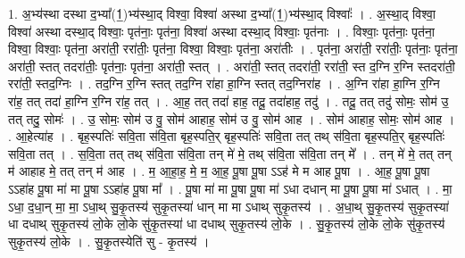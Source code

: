 \documentclass[17pt]{extarticle}
\begin{document}
1. अ॒भ्य॑स्था दस्था द॒भ्या᳚(1॒)भ्य॑स्था॒द् विश्वा॒ विश्वा॑ अस्था द॒भ्या᳚(1॒)भ्य॑स्था॒द् विश्वाः᳚ । . अ॒स्था॒द् विश्वा॒ विश्वा॑ अस्था दस्था॒द् विश्वाः॒ पृत॑नाः॒ पृत॑ना॒ विश्वा॑ अस्था दस्था॒द् विश्वाः॒ पृत॑नाः । . विश्वाः॒ पृत॑नाः॒ पृत॑ना॒ विश्वा॒ विश्वाः॒ पृत॑ना॒ अरा॑ती॒ ररा॑तीः॒ पृत॑ना॒ विश्वा॒ विश्वाः॒ पृत॑ना॒ अरा॑तीः । . पृत॑ना॒ अरा॑ती॒ ररा॑तीः॒ पृत॑नाः॒ पृत॑ना॒ अरा॑ती॒ स्तत् तदरा॑तीः॒ पृत॑नाः॒ पृत॑ना॒ अरा॑ती॒ स्तत् । . अरा॑ती॒ स्तत् तदरा॑ती॒ ररा॑ती॒ स्त द॒ग्नि र॒ग्नि स्तदरा॑ती॒ ररा॑ती॒ स्तद॒ग्निः । . तद॒ग्नि र॒ग्नि स्तत् तद॒ग्नि रा॑हा हा॒ग्नि स्तत् तद॒ग्निरा॑ह । . अ॒ग्नि रा॑हा हा॒ग्नि र॒ग्नि रा॑ह॒ तत् तदा॑ हा॒ग्नि र॒ग्नि रा॑ह॒ तत् । . आ॒ह॒ तत् तदा॑ हाह॒ तदू॒ तदा॑हाह॒ तदु॑ । . तदू॒ तत् तदु॑ सोमः॒ सोम॑ उ॒ तत् तदु॒ सोमः॑ । . उ॒ सोमः॒ सोम॑ उ वु॒ सोम॑ आहाह॒ सोम॑ उ वु॒ सोम॑ आह । . सोम॑ आहाह॒ सोमः॒ सोम॑ आह । . आ॒हेत्या॑ह । . बृह॒स्पतिः॑ सवि॒ता स॑वि॒ता बृह॒स्पति॒र् बृह॒स्पतिः॑ सवि॒ता तत् तथ् स॑वि॒ता बृह॒स्पति॒र् बृह॒स्पतिः॑ सवि॒ता तत् । . स॒वि॒ता तत् तथ् स॑वि॒ता स॑वि॒ता तन् मे॑ मे॒ तथ् स॑वि॒ता स॑वि॒ता तन् मे᳚ । . तन् मे॑ मे॒ तत् तन् म॑ आहाह मे॒ तत् तन् म॑ आह । . म॒ आ॒हा॒ह॒ मे॒ म॒ आ॒ह॒ पू॒षा पू॒षा ऽऽह॑ मे म आह पू॒षा । . आ॒ह॒ पू॒षा पू॒षा ऽऽहा॑ह पू॒षा मा॑ मा पू॒षा ऽऽहा॑ह पू॒षा मा᳚ । . पू॒षा मा॑ मा पू॒षा पू॒षा मा॑ ऽधा दधान् मा पू॒षा पू॒षा मा॑ ऽधात् । . मा॒ ऽधा॒ द॒धा॒न् मा॒ मा॒ ऽधा॒थ् सु॒कृ॒तस्य॑ सुकृ॒तस्या॑ धान् मा मा ऽधाथ् सुकृ॒तस्य॑ । . अ॒धा॒थ् सु॒कृ॒तस्य॑ सुकृ॒तस्या॑ धा दधाथ् सुकृ॒तस्य॑ लो॒के लो॒के सु॑कृ॒तस्या॑ धा दधाथ् सुकृ॒तस्य॑ लो॒के । . सु॒कृ॒तस्य॑ लो॒के लो॒के सु॑कृ॒तस्य॑ सुकृ॒तस्य॑ लो॒के । . सु॒कृ॒तस्येति॑ सु - कृ॒तस्य॑ । \newline
\end{document}
